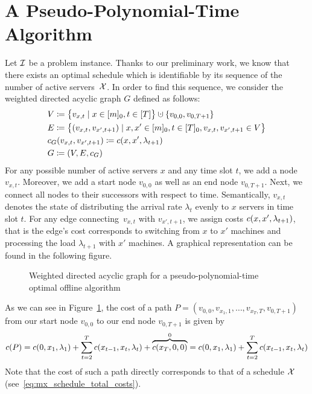 \section{A Pseudo-Polynomial-Time Algorithm}\label{sec:opt_offline_pseudo_poly}
Let $\mathcal{I}$ be a problem instance. Thanks to our preliminary work, we know that there exists an optimal schedule which is identifiable by its sequence of the number of active servers~$\mathcal{X}$. In order to find this sequence, we consider the weighted directed acyclic graph $G$ defined as follows:
\begin{align*}
	&V\coloneqq\bigl\{v_{x,t}\mid x\in[m]_0,t\in[T]\bigr\}\dotcup\{v_{0,0},v_{0,T+1}\}\\
	&E\coloneqq\bigl\{(v_{x,t},v_{x',t+1})\mid x,x'\in[m]_0,t\in[T]_0,v_{x,t},v_{x',t+1}\in V\bigr\}\\
	&c_G(v_{x,t},v_{x',t+1})\coloneqq\costs(x,x',\lambda_{t+1})\\
	&G\coloneqq(V,E,c_G)
\end{align*}
For any possible number of active servers $x$ and any time slot $t$, we add a node $v_{x,t}$. Moreover, we add a start node $v_{0,0}$ as well as an end node $v_{0,T+1}$. Next, we connect all nodes to their successors with respect to time. Semantically, $v_{x,t}$ denotes the state of distributing the arrival rate $\lambda_{t}$ evenly to $x$ servers in time slot $t$. For any edge connecting~$v_{x,t}$ with $v_{x',t+1}$, we assign costs $c(x,x',\lambda_{t+1})$, that is the edge's cost corresponds to switching from $x$ to $x'$ machines and processing the load $\lambda_{t+1}$ with $x'$ machines. A graphical representation can be found in the following figure.
\begin{figure}[H]

\caption{Weighted directed acyclic graph for a pseudo-polynomial-time optimal offline algorithm}
\label{fig:graph_pseudo_poly}
\end{figure}
As we can see in Figure~\ref{fig:graph_pseudo_poly}, the cost of a path $P=(v_{0,0},v_{x_1,1},\dotsc,v_{x_T,T},v_{0,T+1})$ from our start node $v_{0,0}$ to our end node $v_{0,T+1}$ is given by 
\begin{equation}
	c(P)=c(0,x_1,\lambda_1)+\sum\limits_{t=2}^{T}c(x_{t-1},x_{t},\lambda_{t})+\overbrace{c(x_T,0,0)}^{0}=c(0,x_1,\lambda_1)+\sum\limits_{t=2}^{T}c(x_{t-1},x_{t},\lambda_{t})\label{eq:v0_VT1_path_costs}
\end{equation}
Note that the cost of such a path directly corresponds to that of a schedule $\mathcal{X}$ (see~\eqref{eq:mx_schedule_total_costs}).
